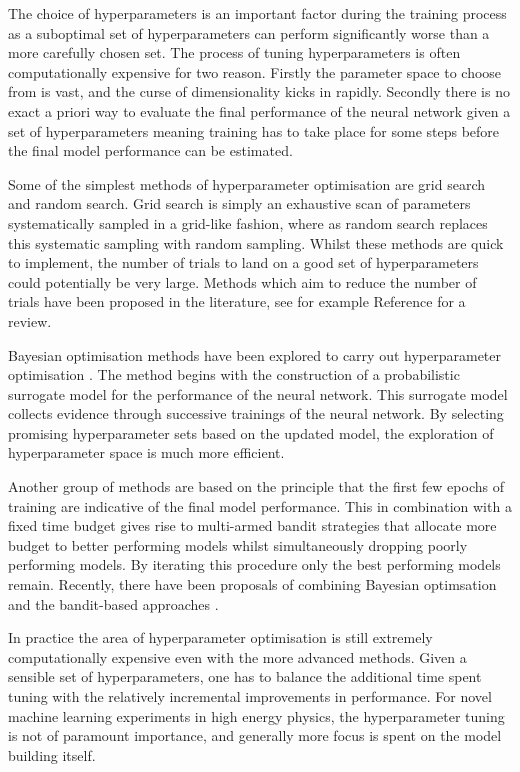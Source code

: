 \documentclass[main.tex]{subfiles}
\begin{document}
    The choice of hyperparameters is an important
    factor during the training process as a suboptimal set
    of hyperparameters can perform significantly worse
    than a more carefully chosen set. The process of tuning
    hyperparameters is often computationally expensive for two
    reason. Firstly the parameter space to choose from is vast,
    and the curse of dimensionality kicks in rapidly.
    Secondly there is no exact a priori way to evaluate the
    final performance of the neural network given a set of
    hyperparameters meaning training has to take place for
    some steps before the final model performance can be estimated.
    
    Some of the simplest methods of hyperparameter optimisation
    are grid search and random search. Grid search is simply
    an exhaustive scan of parameters systematically sampled
    in a grid-like fashion, where as random search replaces
    this systematic sampling with random sampling. Whilst
    these methods are quick to implement, the number of trials
    to land on a good set of hyperparameters could potentially
    be very large. Methods which aim to reduce the number
    of trials have been proposed in the literature, see for example
    Reference \cite{Yu2020HyperParameterOA} for a review.

    Bayesian optimisation methods have been explored
    to carry out hyperparameter optimisation \cite{bergstra2013making,bergstra2015hyperopt}.
    The method  begins with the construction of a probabilistic surrogate
    model for the performance of the neural network. This
    surrogate model collects evidence through successive trainings
    of the neural network. By selecting promising hyperparameter
    sets based on the updated model, the exploration of
    hyperparameter space is much more efficient.

    Another group of methods are based on the principle
    that the first few epochs of training are indicative
    of the final model performance. This in combination
    with a fixed time budget gives rise to multi-armed
    bandit strategies \cite{jamieson2016non,li2017hyperband}
    that allocate more budget to better
    performing models whilst simultaneously dropping poorly
    performing models. By iterating this procedure only the 
    best performing models remain. Recently, there have
    been proposals of combining Bayesian optimsation and
    the bandit-based approaches \cite{falkner2018bohb}.
    
    In practice the area of hyperparameter optimisation
    is still extremely computationally expensive even with
    the more advanced methods. Given a sensible set of hyperparameters,
    one has to balance the additional time spent tuning with the
    relatively incremental improvements in performance. For
    novel machine learning experiments in high energy physics,
    the hyperparameter tuning is not of paramount importance,
    and generally more focus is spent on the model building itself.
\end{document}
